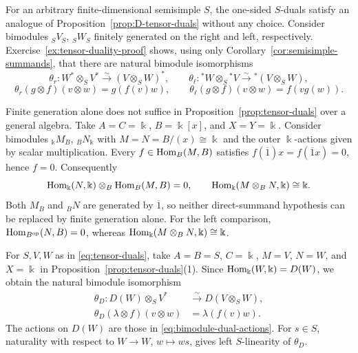 \begin{advanced}
For an arbitrary finite-dimensional semisimple $S$, the one-sided $S$-duals satisfy an analogue of Proposition~\ref{prop:D-tensor-duals} without any choice.
Consider bimodules ${}_SV_S$, ${}_SW_S$ finitely generated on the right and left, respectively.
Exercise~\ref{ex:tensor-duality-proof} shows, using only Corollary~\ref{cor:semisimple-summands}, that there are natural bimodule isomorphisms
\begin{equation}\label{eq:tensor-duals}
\theta_r:W^*\otimes_S V^*\xrightarrow{\sim}(V\otimes_S W)^*,
\qquad
\theta_\ell:{}^*W\otimes_S{}^*V\xrightarrow{\sim}{}^*(V\otimes_S W),
\end{equation}
\begin{equation}\label{eq:tensor-evaluations}
\theta_r(g\otimes f)(v\otimes w)=g(f(v)w),
\qquad
\theta_\ell(g\otimes f)(v\otimes w)=f(vg(w)).
\end{equation}

\begin{example}\label{ex:tensor-dual-finite-generation}
Finite generation alone does not suffice in Proposition~\ref{prop:tensor-duals} over a general algebra.
Take $A=C=\Bbbk$, $B=\Bbbk[x]$, and $X=Y=\Bbbk$.
Consider bimodules ${}_\Bbbk M_B$, ${}_BN_\Bbbk$ with $M=N=B/(x)\cong\Bbbk$ and the outer $\Bbbk$-actions given by scalar multiplication.
Every $f\in\operatorname{Hom}\nolimits_B(M,B)$ satisfies $f(\overline1)x=f(\overline1x)=0$, hence $f=0$.
Consequently
\[
\operatorname{Hom}\nolimits_\Bbbk(N,\Bbbk)\otimes_B\operatorname{Hom}\nolimits_B(M,B)=0,\qquad
\operatorname{Hom}\nolimits_\Bbbk(M\otimes_B N,\Bbbk)\cong\Bbbk.
\]
Both $M_B$ and $ {}_B N$ are generated by $\overline1$, so neither direct-summand hypothesis can be replaced by finite generation alone.
For the left comparison, $\operatorname{Hom}\nolimits_{B^{\mathrm{op}}}(N,B)=0$, whereas $\operatorname{Hom}\nolimits_\Bbbk(M\otimes_B N,\Bbbk)\cong\Bbbk$.
\end{example}

\label{not:mixed-tensor-dual}
For $S,V,W$ as in \eqref{eq:tensor-duals}, take $A=B=S$, $C=\Bbbk$, $M=V$, $N=W$, and $X=\Bbbk$ in Proposition~\ref{prop:tensor-duals}(1).
Since $\operatorname{Hom}\nolimits_\Bbbk(W,\Bbbk)=D(W)$, we obtain the natural bimodule isomorphism \cite[\S2.1]{GI20}
\[
\begin{aligned}
\theta_D:D(W)\otimes_S V^*&\xrightarrow{\sim}D(V\otimes_S W),\\
\theta_D(\lambda\otimes f)(v\otimes w)&=\lambda(f(v)w).
\end{aligned}
\]
The actions on $D(W)$ are those in \eqref{eq:bimodule-dual-actions}.
For $s\in S$, naturality with respect to $W\to W$, $w\mapsto ws$, gives left $S$-linearity of $\theta_D$.


\end{advanced}

